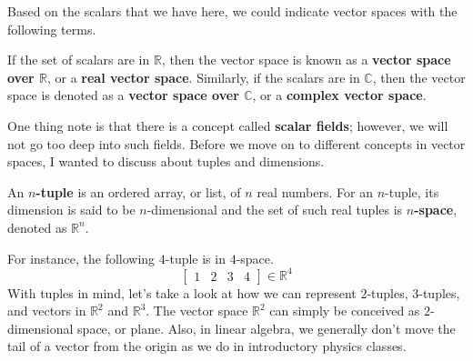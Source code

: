 \documentclass[../main.tex]{subfiles}
\begin{document}
Based on the scalars that we have here, we could indicate vector
spaces with the following terms.

\begin{definition}
If the set of scalars are in $\mathbb{R}$, then the vector space
is known as a \textbf{vector space over $\mathbb{R}$}, or a
\textbf{real vector space}. Similarly, if the scalars are in
$\mathbb{C}$, then the vector space is denoted as a
\textbf{vector space over $\mathbb{C}$}, or a \textbf{complex vector
space}.
\end{definition}

One thing note is that there is a concept called \textbf{scalar
fields}; however, we will not go too deep into such fields.
Before we move on to different concepts in vector spaces, I wanted
to discuss about tuples and dimensions.

\begin{definition}
An \textbf{$n$-tuple} is an ordered array, or list, of $n$ real
numbers. For an $n$-tuple, its dimension is said to be $n$-dimensional
and the set of such real tuples is \textbf{$n$-space}, denoted as
$\mathbb{R}^n$.
\end{definition}

For instance, the following $4$-tuple is in $4$-space.
\[
\begin{bmatrix}
    1 & 2 & 3 & 4
\end{bmatrix}
\in
\mathbb{R}^4
\]
With tuples in mind, let's take a look at how we can represent
$2$-tuples, $3$-tuples, and vectors in $\mathbb{R}^2$ and
$\mathbb{R}^3$. The vector space $\mathbb{R}^2$ can simply be
conceived as $2$-dimensional space, or plane. Also, in linear
algebra, we generally don't move the tail of a vector from the origin
as we do in introductory physics classes.

\begin{figure}[H]
\centering
{}
\end{figure}
\end{document}
